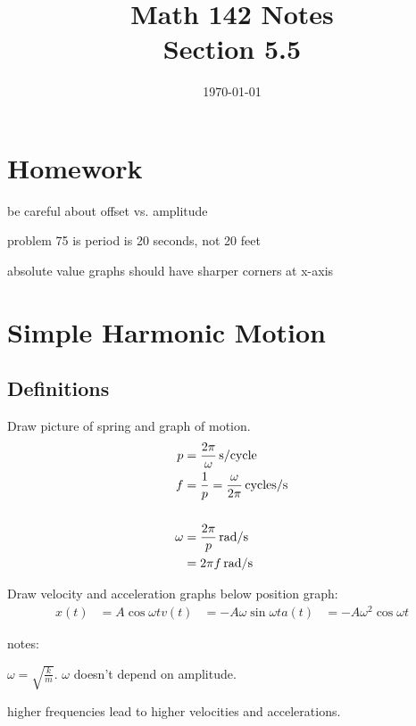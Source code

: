 \documentclass{exam}
\title{Math 142 Notes \\ Section 5.5}
\date{\today}
\begin{document}
  \maketitle
  \tableofcontents

  \pagebreak

  \section{Homework}
  \begin{itemize*}
    \item be careful about offset vs. amplitude
    \item problem 75 is period is 20 seconds, not 20 feet
    \item absolute value graphs should have sharper corners at x-axis
  \end{itemize*}

  \section{Simple Harmonic Motion}

  \subsection{Definitions}
    Draw picture of spring and graph of motion.
    \begin{align*}
      p      & = \unit[ \frac{2 \pi}{\omega} ]{s/cycle} \\
      f      & = \frac{1}{p} = \unit[ \frac{\omega}{2 \pi} ]{cycles/s} \\
      \\
      \omega & = \unit[ \frac{2 \pi}{p} ]{rad/s} \\
             & = \unit[ 2 \pi f ]{rad/s} \\
    \end{align*}

    Draw velocity and acceleration graphs below position graph:
    \begin{align*}
      x(t) &= A \cos \omega t
      v(t) &= - A \omega \sin \omega t
      a(t) &= - A \omega^2 \cos \omega t
    \end{align*}

    notes:
    \begin{itemize*}
      \item $\omega = \sqrt{\frac{k}{m}}$.  $\omega$ doesn't depend on amplitude.
      \item higher frequencies lead to higher velocities and accelerations.
    \end{itemize*}
\end{document}
